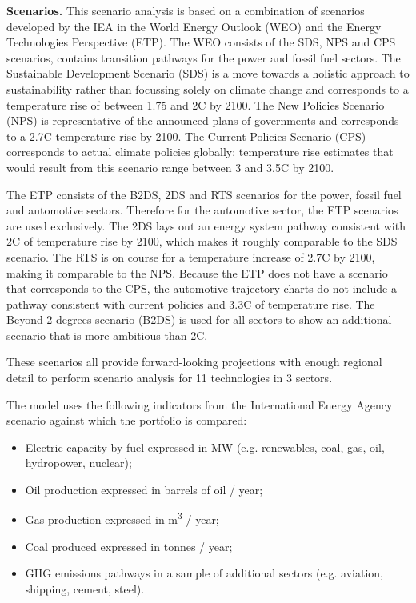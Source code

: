 \documentclass[10pt,table,a4]{article}\usepackage[]{graphicx}\usepackage[]{color}
\begin{document}
\begin{multicols}{2}
		\textbf{Scenarios.} This scenario analysis is based on a combination of scenarios developed by the IEA in the World Energy Outlook (WEO) and the Energy Technologies Perspective (ETP). The WEO consists of the SDS, NPS and CPS scenarios, contains transition pathways for the power and fossil fuel sectors. The Sustainable Development Scenario (SDS) is a move towards a holistic approach to sustainability rather than focussing solely on climate change and corresponds to a temperature rise of between 1.75 and 2\degree C by 2100.  The New Policies Scenario (NPS) is representative of the announced plans of governments and corresponds to a 2.7\degree C temperature rise by 2100. The Current Policies Scenario (CPS) corresponds to actual climate policies globally; temperature rise estimates that would result from this scenario range between 3 and 3.5\degree C by 2100. 
		
		The ETP consists of the B2DS, 2DS and RTS scenarios for the power, fossil fuel and automotive sectors. Therefore for the automotive sector, the ETP scenarios are used exclusively. The 2DS lays out an energy system pathway consistent with 2\degree C of temperature rise by 2100, which makes it roughly comparable to the SDS scenario. The RTS is on course for a temperature increase of 2.7\degree C by 2100, making it comparable to the NPS. Because the ETP does not have a scenario that corresponds to the CPS, the automotive trajectory charts do not include a pathway consistent with current policies and 3.3\degree C of temperature rise. The Beyond 2 degrees scenario (B2DS) is used for all sectors to show an additional scenario that is more ambitious than 2\degree C.
		
		These scenarios all provide forward-looking projections with enough regional detail to perform scenario analysis for 11 technologies in 3 sectors.
		
		The model uses the following indicators from the International Energy Agency scenario against which the portfolio is compared:
		\begin{itemize}
			\item{Electric capacity by fuel expressed in MW (e.g. renewables, coal, gas, oil, hydropower, nuclear);}
			\item{Oil production expressed in barrels of oil / year;}
			\item{Gas production expressed in m\textsuperscript{3} / year;}
			\item{Coal produced expressed in tonnes / year;}
			\item{GHG emissions pathways in a sample of additional sectors (e.g. aviation, shipping, cement, steel).}
		\end{itemize}
		

\end{multicols}
\end{document}
